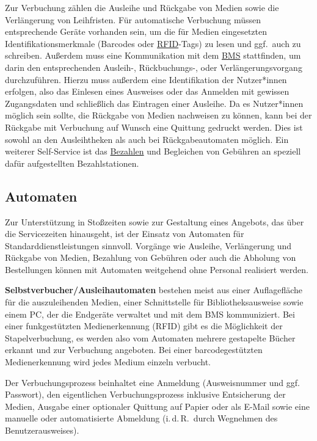 \documentclass[
  11pt,
  letterpaper,
  DIV=11,
  twoside]{scrreprt}
\begin{document}
Zur Verbuchung zählen die Ausleihe und Rückgabe von Medien sowie die
Verlängerung von Leihfristen. Für automatische Verbuchung müssen
entsprechende Geräte vorhanden sein, um die für Medien eingesetzten
Identifikationsmerkmale (Barcodes oder \hyperref[rfid]{RFID}-Tags) zu
lesen und ggf.~auch zu schreiben. Außerdem muss eine Kommunikation mit
dem \hyperref[automatisierung-prozess]{BMS} stattfinden, um darin den
entsprechenden Ausleih-, Rückbuchungs-, oder Verlängerungsvorgang
durchzuführen. Hierzu muss außerdem eine Identifikation der Nutzer*innen
erfolgen, also das Einlesen eines Ausweises oder das Anmelden mit
gewissen Zugangsdaten und schließlich das Eintragen einer Ausleihe. Da
es Nutzer*innen möglich sein sollte, die Rückgabe von Medien nachweisen
zu können, kann bei der Rückgabe mit Verbuchung auf Wunsch eine Quittung
gedruckt werden. Dies ist sowohl an den Ausleihtheken als auch bei
Rückgabeautomaten möglich. Ein weiterer Self-Service ist das
\hyperref[bezahlung]{Bezahlen} und Begleichen von Gebühren an speziell
dafür aufgestellten Bezahlstationen.

\subsection{Automaten}\label{automaten}

Zur Unterstützung in Stoßzeiten sowie zur Gestaltung eines Angebots, das
über die Servicezeiten hinausgeht, ist der Einsatz von Automaten für
Standarddienstleistungen sinnvoll. Vorgänge wie Ausleihe, Verlängerung
und Rückgabe von Medien, Bezahlung von Gebühren oder auch die Abholung
von Bestellungen können mit Automaten weitgehend ohne Personal
realisiert werden.

\textbf{Selbstverbucher/Ausleihautomaten} bestehen meist aus einer
Auflagefläche für die auszuleihenden Medien, einer Schnittstelle für
Bibliotheksausweise sowie einem PC, der die Endgeräte verwaltet und mit
dem BMS kommuniziert. Bei einer funkgestützten Medienerkennung (RFID)
gibt es die Möglichkeit der Stapelverbuchung, es werden also vom
Automaten mehrere gestapelte Bücher erkannt und zur Verbuchung
angeboten. Bei einer barcodegestützten Medienerkennung wird jedes Medium
einzeln verbucht.

Der Verbuchungsprozess beinhaltet eine Anmeldung (Ausweisnummer und ggf.
Passwort), den eigentlichen Verbuchungsprozess inklusive Entsicherung
der Medien, Ausgabe einer optionaler Quittung auf Papier oder als E-Mail
sowie eine manuelle oder automatisierte Abmeldung (i.\,d.\,R.~durch
Wegnehmen des Benutzerausweises).
\end{document}
